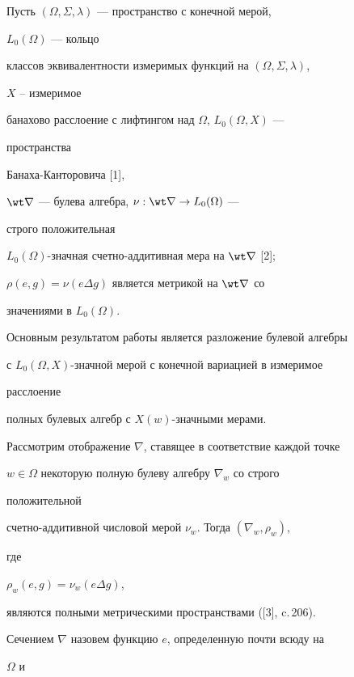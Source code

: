 \label{begin} 


 


 


Пусть $(\Omega,\Sigma,\lambda)$ --- пространство с конечной мерой, 


$L_0(\Omega)$ --- кольцо  


классов эквивалентности измеримых функций на $(\Omega,\Sigma,\lambda)$, 


$X$ -- измеримое 


банахово расслоение с лифтингом над $\Omega$, $L_0(\Omega,X)$ --- 


пространства  


Банаха-Канторовича [1], 


$\wt\nabla$ --- булева алгебра, $\nu:\wt\nabla\to L_0(\Omega)$ --- 


строго положительная 


$L_0(\Omega)$-значная счетно-аддитивная мера на $\wt\nabla$ [2]; 


$\rho(e,g)=\nu(e\Delta g)$ является метрикой на $\wt\nabla$ со 


значениями в $L_0(\Omega)$. 


 


Основным результатом работы является разложение булевой алгебры 


с $L_0(\Omega,X)$-значной мерой с конечной вариацией в измеримое 


расслоение 


полных булевых алгебр с $X(w)$-значными мерами.  


 


Рассмотрим отображение $\nabla$, ставящее в соответствие каждой точке  


$w\in\Omega$ некоторую полную булеву алгебру $\nabla_w$ со строго 


положительной  


счетно-аддитивной числовой мерой $\nu_w$. Тогда $(\nabla_w,\rho_w)$, 


где 


$\rho_w(e,g)=\nu_w(e\Delta g)$, 


являются полными метрическими пространствами ([3], c.\,206).


 


Сечением $\nabla$ назовем функцию $e$, определенную почти всюду на 


$\Omega$ и  


